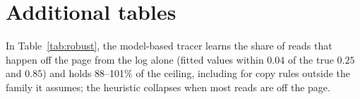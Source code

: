 \section{Additional tables}\label{app:tables}







In Table~\ref{tab:robust}, the model-based tracer learns the share of reads that happen off the page from the log alone (fitted values within $0.04$ of the true $0.25$ and $0.85$) and holds 88--101\% of the ceiling, including for copy rules outside the family it assumes; the heuristic collapses when most reads are off the page.
